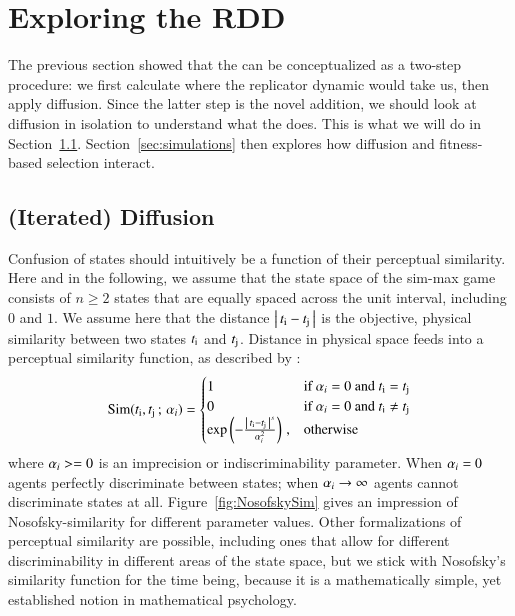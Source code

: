 \section{Exploring the RDD}

The previous section showed that the \rdd can be conceptualized as a
two-step procedure: we first calculate where the replicator dynamic
would take us, then apply diffusion. Since the latter step is the
novel addition, we should look at diffusion in isolation to understand
what the \rdd does. This is what we will do in
Section~\ref{sec:iterated-diffusion}. Section~\ref{sec:simulations}
 then explores how diffusion and fitness-based selection interact.

\subsection{(Iterated) Diffusion}
\label{sec:iterated-diffusion}



Confusion of states should intuitively be a function of their
perceptual similarity. Here and in the following, we assume that the
state space of the sim-max game consists of $n \ge 2$ states that are
equally spaced across the unit interval, including $0$ and $1$. We
assume here that the distance $\left \lvert \, t_{\mathrm{i}} - t_{\mathrm{j}} \, \right\rvert$ is
the objective, physical similarity between two states $t_{\mathrm{i}}$
and $t_{\mathrm{j}}$. Distance in physical space feeds into a perceptual
similarity function, as described by
\citet{Nosofsky1986:Attention-Simil}:
\begin{align}
  \label{eq:NosofskySim}
  \mathrm{Sim}(t_{\mathrm{i}}, t_{\mathrm{j}} \thinspace ; \thinspace \alpha_i) =
      \begin{cases}
    1 & \textrm{if } \alpha_i = 0 \textrm{ and } t_{\mathrm{i}} = t_{\mathrm{j}} \\
    0 & \textrm{if } \alpha_i = 0 \textrm{ and } t_{\mathrm{i}} \neq t_{\mathrm{j}} \\
 \operatorname{exp} \left ( -  \frac{\left \lvert \, t_{\mathrm{i}} - t_{\mathrm{j}} \, \right\rvert^s}{ \alpha_i^2} \right ) \,,& \textrm{otherwise} \\
    \end{cases}
\end{align}
where $\alpha_i >= 0$ is an imprecision or indiscriminability
parameter. When $\alpha_i=0$ agents perfectly discriminate between
states; when $\alpha_i \rightarrow \infty$ agents cannot
discriminate states at all. Figure~\ref{fig:NosofskySim} gives an
impression of Nosofsky-similarity for different parameter
values. Other formalizations of perceptual similarity are possible,
including ones that allow for different discriminability in different
areas of the state space, but we stick with Nosofsky's similarity
function for the time being, because it is a mathematically simple,
yet established notion in mathematical psychology.

